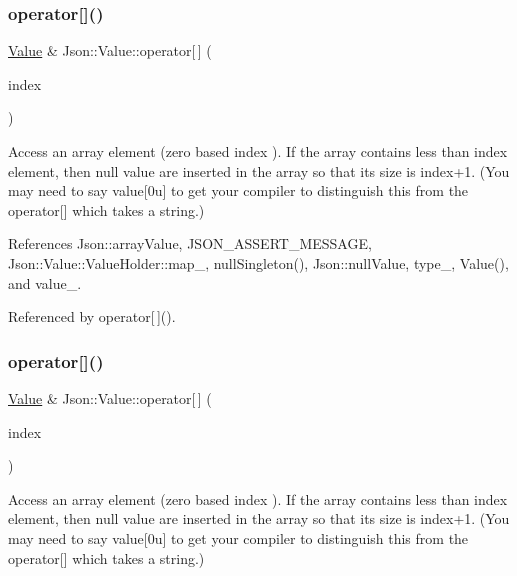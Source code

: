 \subsubsection{\texorpdfstring{operator[]()}{operator[]()}\hspace{0.1cm}{\footnotesize\ttfamily [1/9]}}
{\footnotesize\ttfamily \hyperlink{classJson_1_1Value}{Value} \& Json\+::\+Value\+::operator\mbox{[}$\,$\mbox{]} (\begin{DoxyParamCaption}\item[{\hyperlink{classJson_1_1Value_a184a91566cccca7b819240f0d5561c7d_a184a91566cccca7b819240f0d5561c7d}{Array\+Index}}]{index }\end{DoxyParamCaption})}

Access an array element (zero based index ). If the array contains less than index element, then null value are inserted in the array so that its size is index+1. (You may need to say \textquotesingle{}value\mbox{[}0u\mbox{]}\textquotesingle{} to get your compiler to distinguish this from the operator\mbox{[}\mbox{]} which takes a string.) 

References Json\+::array\+Value, J\+S\+O\+N\+\_\+\+A\+S\+S\+E\+R\+T\+\_\+\+M\+E\+S\+S\+A\+GE, Json\+::\+Value\+::\+Value\+Holder\+::map\+\_\+, null\+Singleton(), Json\+::null\+Value, type\+\_\+, Value(), and value\+\_\+.



Referenced by operator\mbox{[}$\,$\mbox{]}().

\mbox{\label{classJson_1_1Value_ac9182982c361e0ab621134d406e5f250_ac9182982c361e0ab621134d406e5f250}} 
\subsubsection{\texorpdfstring{operator[]()}{operator[]()}\hspace{0.1cm}{\footnotesize\ttfamily [2/9]}}
{\footnotesize\ttfamily \hyperlink{classJson_1_1Value}{Value} \& Json\+::\+Value\+::operator\mbox{[}$\,$\mbox{]} (\begin{DoxyParamCaption}\item[{int}]{index }\end{DoxyParamCaption})}

Access an array element (zero based index ). If the array contains less than index element, then null value are inserted in the array so that its size is index+1. (You may need to say \textquotesingle{}value\mbox{[}0u\mbox{]}\textquotesingle{} to get your compiler to distinguish this from the operator\mbox{[}\mbox{]} which takes a string.) 

